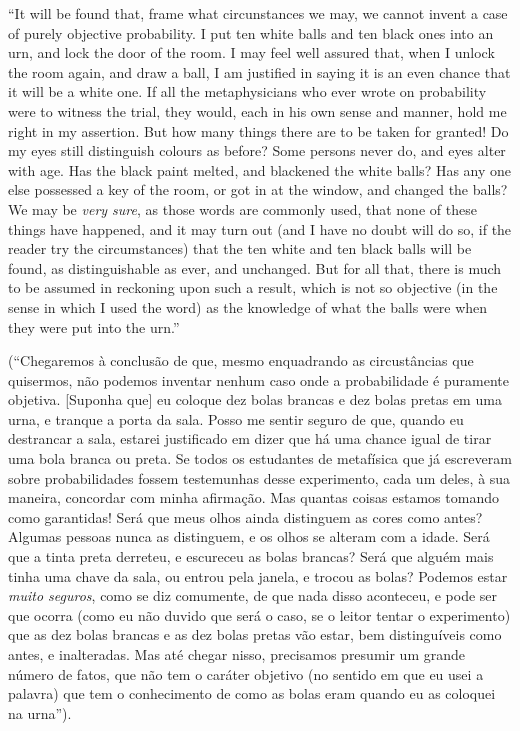 \documentclass[12pt,a4paper]{article}
\begin{document}
``It will be found that, frame what circunstances we may, we cannot invent a case of purely objective probability.
I put ten white balls and ten black ones into an urn, and lock the door of the room. I may feel well assured that,
when I unlock the room again, and draw a ball, I am justified in saying it is an even chance that it will be a white one.
If all the metaphysicians who ever wrote on probability were to witness the trial, they would, each in his own sense and 
manner, hold me right in my assertion. But how many things there are to be taken for granted! Do my eyes still distinguish
colours as before? Some persons never do, and eyes alter with age. Has the black paint melted, and blackened the white balls?
Has any one else possessed a key of the room, or got in at the window, and changed the balls? We may be {\em very sure},
as those words are commonly used, that none of these things have happened, and it may turn out (and I have no doubt will do so,
if the reader try the circumstances) that the ten white and ten black balls will be found, as distinguishable as ever, and
unchanged. But for all that, there is much to be assumed in reckoning upon such a result, which is not so objective (in the
sense in which I used the word) as the knowledge of what the balls were when they were put into the urn.'' \cite{deMorgan1847}

(``Chegaremos à conclusão de que, mesmo enquadrando as circustâncias que quisermos, não podemos inventar nenhum caso onde a 
probabilidade é puramente objetiva. [Suponha que] eu coloque dez bolas brancas e dez bolas pretas em uma urna, e tranque a porta
da sala. Posso me sentir seguro de que, quando eu destrancar a sala, estarei justificado em dizer que há uma chance igual de 
tirar uma bola branca ou preta. Se todos os estudantes de metafísica que já escreveram sobre probabilidades fossem testemunhas
desse experimento, cada um deles, à sua maneira, concordar com minha afirmação. Mas quantas coisas estamos tomando como 
garantidas! Será que meus olhos ainda distinguem as cores como antes? Algumas pessoas nunca as distinguem, e os olhos se 
alteram com a idade. Será que a tinta preta derreteu, e escureceu as bolas brancas? Será que alguém mais tinha uma chave da sala,
ou entrou pela janela, e trocou as bolas? Podemos estar {\em muito seguros}, como se diz comumente, de que nada disso aconteceu,
e pode ser que ocorra (como eu não duvido que será o caso, se o leitor tentar o experimento) que as dez bolas brancas e as 
dez bolas pretas vão estar, bem distinguíveis como antes, e inalteradas. Mas até chegar nisso, precisamos presumir um grande
número de fatos, que não tem o caráter objetivo (no sentido em que eu usei a palavra) que tem o conhecimento de como as bolas
eram quando eu as coloquei na urna'').
\end{document}
